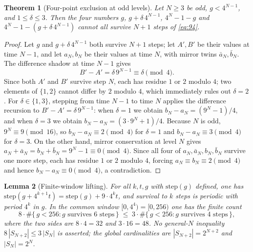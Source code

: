 \documentclass[11pt,a4paper]{article}
\newtheorem{theorem}{Theorem}[section]
\newtheorem{lemma}[theorem]{Lemma}
\theoremstyle{remark}
\begin{document}
\begin{theorem}[Four-point exclusion at odd levels]
\label{thm:klein}
Let $N \ge 3$ be odd, $g < 4^{N-1}$, and $1 \le \delta \le 3$. Then the four numbers $g$, $g + \delta\,4^{N-1}$, $4^{N} - 1 - g$ and $4^{N} - 1 - (g + \delta\,4^{N-1})$ cannot all survive $N+1$ steps of \eqref{eq:94}.
\end{theorem}

\begin{proof}
Let $g$ and $g + \delta\,4^{N-1}$ both survive $N+1$ steps; let $A', B'$ be their values at time $N-1$, and let $a_{N}, b_{N}$ be their values at time $N$, with mirror twins $\bar a_{N}, \bar b_{N}$. The difference shadow at time $N-1$ gives
\[
  B' - A' = \delta\, 9^{N-1} \equiv \delta \pmod 4.
\]
Since both $A'$ and $B'$ survive step $N$, each has residue $1$ or $2$ modulo $4$; two elements of $\{1,2\}$ cannot differ by $2$ modulo $4$, which immediately rules out $\delta = 2$. For $\delta \in \{1,3\}$, stepping from time $N-1$ to time $N$ applies the difference recursion to $B' - A' = \delta\, 9^{N-1}$: when $\delta = 1$ we obtain $b_{N} - a_{N} = (9^{N} - 1)/4$, and when $\delta = 3$ we obtain $b_{N} - a_{N} = (3 \cdot 9^{N} + 1)/4$. Because $N$ is odd, $9^{N} \equiv 9 \pmod{16}$, so $b_{N} - a_{N} \equiv 2 \pmod 4$ for $\delta = 1$ and $b_{N} - a_{N} \equiv 3 \pmod 4$ for $\delta = 3$. On the other hand, mirror conservation at level $N$ gives $a_{N} + \bar a_{N} = b_{N} + \bar b_{N} = 9^{N} - 1 \equiv 0 \pmod 4$. Since all four of $a_{N}, \bar a_{N}, b_{N}, \bar b_{N}$ survive one more step, each has residue $1$ or $2$ modulo $4$, forcing $a_{N} \equiv b_{N} \equiv 2 \pmod 4$ and hence $b_{N} - a_{N} \equiv 0 \pmod 4$, a contradiction.
\end{proof}

\begin{lemma}[Finite-window lifting]
\label{lem:lift}
For all $k, t, g$ with $\mathrm{step}(g)$ defined, one has $\mathrm{step}(g + 4^{k+1} t) = \mathrm{step}(g) + 9 \cdot 4^{k} t$, and survival to $k$ steps is periodic with period $4^{k}$ in $g$. In the common window $[0, 4^{4}) = [0,256)$ one has the finite count
\[
  8 \cdot \#\{\, g < 256 : g \text{ survives } 6 \text{ steps} \,\}
  \;\le\;
  3 \cdot \#\{\, g < 256 : g \text{ survives } 4 \text{ steps} \,\},
\]
where the two sides are $8 \cdot 4 = 32$ and $3 \cdot 16 = 48$. No general-$N$ inequality $8\,|S_{N+2}| \le 3\,|S_{N}|$ is asserted; the global cardinalities are $|S_{N+2}| = 2^{N+2}$ and $|S_{N}| = 2^{N}$.
\end{lemma}
\end{document}
